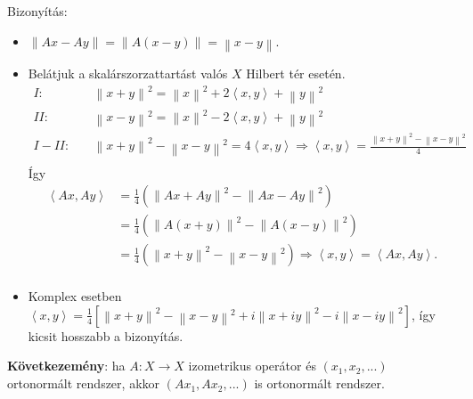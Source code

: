 \documentclass[12pt,a4paper]{scrartcl}
\providecommand{\tightlist}{%
  \setlength{\itemsep}{0pt}\setlength{\parskip}{0pt}}
\newenvironment{bizonyitas}{}{}
\begin{document}
\begin{bizonyitas}

Bizonyítás:

\begin{itemize}
\tightlist
\item
  \(\left\| {Ax - Ay} \right\| = \left\| {A\left( {x - y} \right)} \right\| = \left\| {x - y} \right\|\).
\item
  Belátjuk a skalárszorzattartást valós \(X\) Hilbert tér esetén.
  \[\begin{aligned}
    I:\quad  & {\left\| {x + y} \right\|^2} = {\left\| x \right\|^2} + 2\left\langle {x,y} \right\rangle  + {\left\| y \right\|^2} \\ 
    II:\quad  & {\left\| {x - y} \right\|^2} = {\left\| x \right\|^2} - 2\left\langle {x,y} \right\rangle  + {\left\| y \right\|^2} \\ 
    I - II:\quad  & {\left\| {x + y} \right\|^2} - {\left\| {x - y} \right\|^2} = 4\left\langle {x,y} \right\rangle  \Rightarrow \left\langle {x,y} \right\rangle  = \frac{{{{\left\| {x + y} \right\|}^2} - {{\left\| {x - y} \right\|}^2}}}{4} \\ 
  \end{aligned} \] Így \[\begin{aligned}
    \left\langle {Ax,Ay} \right\rangle  &  = \frac{1}{4}\left( {{{\left\| {Ax + Ay} \right\|}^2} - {{\left\| {Ax - Ay} \right\|}^2}} \right) \\ 
     &  = \frac{1}{4}\left( {{{\left\| {A\left( {x + y} \right)} \right\|}^2} - {{\left\| {A\left( {x - y} \right)} \right\|}^2}} \right) \\ 
     &  = \frac{1}{4}\left( {{{\left\| {x + y} \right\|}^2} - {{\left\| {x - y} \right\|}^2}} \right) \Rightarrow \left\langle {x,y} \right\rangle  = \left\langle {Ax,Ay} \right\rangle . \\ 
  \end{aligned} \]
\item
  Komplex esetben
  \(\left\langle {x,y} \right\rangle = \frac{1}{4}\left\lbrack {\left\| {x + y} \right\|^{2} - \left\| {x - y} \right\|^{2} + i\left\| {x + iy} \right\|^{2} - i\left\| {x - iy} \right\|^{2}} \right\rbrack\),
  így kicsit hosszabb a bizonyítás.
\end{itemize}

\end{bizonyitas}

\textbf{Következemény}: ha \(\left. A:X\rightarrow X \right.\)
izometrikus operátor és \(\left( {x_{1},x_{2},...} \right)\) ortonormált
rendszer, akkor \(\left( {Ax_{1},Ax_{2},...} \right)\) is ortonormált
rendszer.
\end{document}
